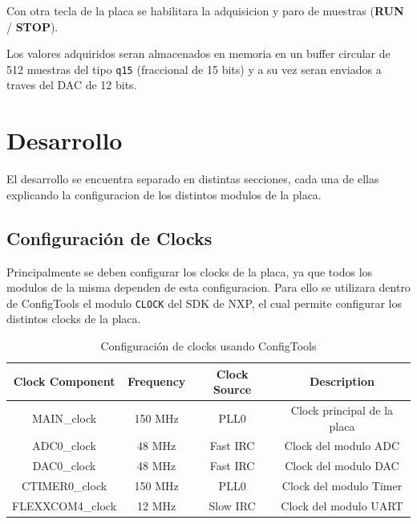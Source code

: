 \documentclass[11pt,a4paper]{article}
\begin{document}
Con otra tecla de la placa se habilitara la adquisicion y paro de muestras
(\textbf{RUN} / \textbf{STOP}).

Los valores adquiridos seran almacenados en memoria en un buffer circular de
512 muestras del tipo \texttt{q15} (fraccional de 15 bits) y a su vez seran
enviados a traves del DAC de 12 bits.

\section{Desarrollo}

El desarrollo se encuentra separado en distintas secciones, cada una de ellas
explicando la configuracion de los distintos modulos de la placa.

\subsection{Configuración de Clocks}

Principalmente se deben configurar los clocks de la placa, ya que todos los
modulos de la misma dependen de esta configuracion. Para ello se utilizara
dentro de ConfigTools el modulo \texttt{CLOCK} del SDK de NXP, el cual permite
configurar los distintos clocks de la placa.

\begin{table}[H]
    \centering
    \begin{tabular}{|c|c|c|c|}
        \hline
        \textbf{Clock Component} & \textbf{Frequency} & \textbf{Clock Source} & \textbf{Description}        \\
        \hline
        MAIN\_clock              & 150 MHz            & PLL0                  & Clock principal de la placa \\
        ADC0\_clock              & 48 MHz             & Fast IRC              & Clock del modulo ADC        \\
        DAC0\_clock              & 48 MHz             & Fast IRC              & Clock del modulo DAC        \\
        CTIMER0\_clock           & 150 MHz            & PLL0                  & Clock del modulo Timer      \\
        FLEXXCOM4\_clock         & 12 MHz             & Slow IRC              & Clock del modulo UART       \\
        \hline
    \end{tabular}
    \caption{Configuración de clocks usando ConfigTools}
\end{table}
\end{document}
